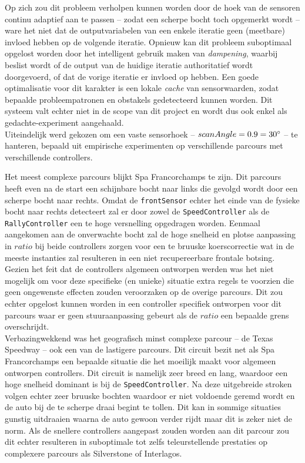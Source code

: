 \documentclass[10pt,a4paper]{article}
\begin{document}
			Op zich zou dit probleem verholpen kunnen worden door de hoek van de sensoren continu adaptief aan te passen -- zodat een scherpe bocht toch opgemerkt wordt -- ware het niet dat de outputvariabelen van een enkele iteratie geen (meetbare) invloed hebben op de volgende iteratie. Opnieuw kan dit probleem suboptimaal opgelost worden door het intelligent gebruik maken van \textit{dampening}, waarbij beslist wordt of de output van de huidige iteratie authoritatief wordt doorgevoerd, of dat de vorige iteratie er invloed op hebben. Een goede optimalisatie voor dit karakter is een lokale \textit{cache} van sensorwaarden, zodat bepaalde probleempatronen en obstakels gedetecteerd kunnen worden. Dit systeem valt echter niet in de scope van dit project en wordt dus ook enkel als gedachte-experiment aangehaald.\\

			Uiteindelijk werd gekozen om een vaste sensorhoek -- $scanAngle = 0.9 = 30 \degree$ -- te hanteren, bepaald uit empirische experimenten op verschillende parcours met verschillende controllers.

			Het meest complexe parcours blijkt Spa Francorchamps te zijn. Dit parcours heeft even na de start een schijnbare bocht naar links die gevolgd wordt door een scherpe bocht naar rechts. Omdat de \texttt{frontSensor} echter het einde van de fysieke bocht naar rechts detecteert zal er door zowel de \texttt{SpeedController} als de \texttt{RallyController} een te hoge versnelling opgedragen worden. Eenmaal aangekomen aan de onverwachte bocht zal de hoge snelheid en plotse aanpassing in $ratio$ bij beide controllers zorgen voor een te bruuske koerscorrectie wat in de meeste instanties zal resulteren in een niet recupereerbare frontale botsing. Gezien het feit dat de controllers algemeen ontworpen werden was het niet mogelijk om voor deze specifieke (en unieke) situatie extra regels te voorzien die geen ongewenste effecten zouden veroorzaken op de overige parcours. Dit zou echter opgelost kunnen worden in een controller specifiek ontworpen voor dit parcours waar er geen stuuraanpassing gebeurt als de $ratio$ een bepaalde grens overschrijdt.\\

			Verbazingwekkend was het geografisch minst complexe parcour -- de Texas Speedway -- ook een van de lastigere parcours. Dit circuit bezit net als Spa Francorchamps een bepaalde situatie die het moeilijk maakt voor algemeen ontworpen controllers. Dit circuit is namelijk zeer breed en lang, waardoor een hoge snelheid dominant is bij de \texttt{SpeedController}. Na deze uitgebreide stroken volgen echter zeer bruuske bochten waardoor er niet voldoende geremd wordt en de auto bij de te scherpe draai begint te tollen. Dit kan in sommige situaties gunstig uitdraaien waarna de auto gewoon verder rijdt maar dit is zeker niet de norm. Als de snellere controllers aangepast zouden worden aan dit parcour zou dit echter resulteren in suboptimale tot zelfs teleurstellende prestaties op complexere parcours als Silverstone of Interlagos.\\
\end{document}
